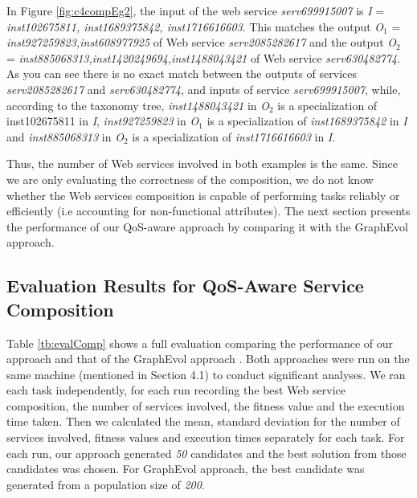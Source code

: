 \begin{exmp}
In Figure \ref{fig:c4compEg2},  the input of the web service \emph{serv699915007} is \emph{I} = \emph{{inst102675811, inst1689375842, inst1716616603}}. This matches the output \emph{O$_1$} = \emph{{inst927259823,inst608977925 }} of Web service  \emph{serv2085282617} and the output \emph{O$_2$} = \emph{{inst885068313,inst1420249694,inst1488043421 }} of Web service  \emph{serv630482774}. As you can see there is no exact match between the outputs of services \emph{serv2085282617} and \emph{serv630482774}, and inputs of service \emph{serv699915007}, while, according to the taxonomy tree, \emph{inst1488043421} in \emph{O$_2$} is a specialization of inst102675811 in \emph{I}, \emph{inst927259823} in \emph{O$_1$} is a specialization of \emph{inst1689375842} in \emph{I} and  \emph{inst885068313} in \emph{O$_2$} is a specialization of \emph{inst1716616603} in \emph{I}.\par
\end{exmp}

Thus, the number of Web services involved in both examples is the same. Since we are only evaluating the correctness of the composition, we do not know whether the Web services composition is capable of performing tasks reliably or efficiently (i.e accounting for non-functional attributes). The next section presents the performance of our QoS-aware approach by comparing it with the GraphEvol approach.\par

\subsection{Evaluation Results for QoS-Aware Service Composition} 
Table \ref{tb:evalComp} shows a full evaluation comparing the performance of our approach and that of the  GraphEvol approach \cite{2}. Both approaches were run on the same machine (mentioned in Section 4.1) to conduct significant analyses. We ran each task independently, for each run recording the best Web service composition, the number of services involved, the fitness value and the execution time taken. Then we calculated the mean, standard deviation for the number of services involved, fitness values and execution times separately for each task. For each run, our approach generated \emph{50} candidates and the best solution from those candidates was chosen. For GraphEvol approach, the best candidate was generated from a population size of \emph{200}.\par


